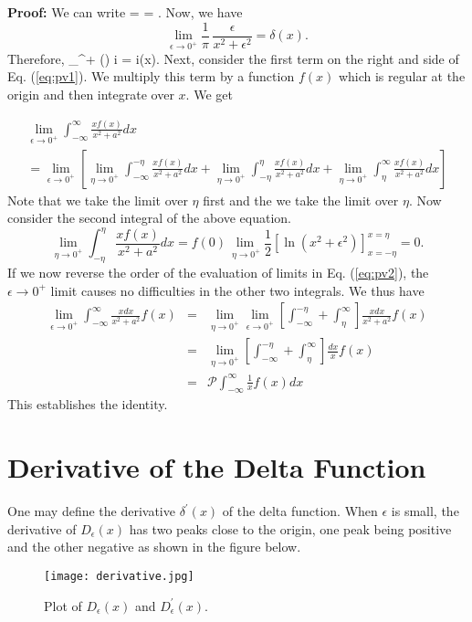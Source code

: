 \noindent
{\bf Proof:}\newline
We can write
\be
{} = =  \mp {}.
\label{eq:pv1}
\ee
Now, we have
\[ \lim_{\epsilon \rightarrow 0^+} \frac{1}{\pi}\, \frac{\epsilon}{x^2+ \epsilon^2} = \delta(x). \]
Therefore,
\be
\lim_{\epsilon {}^+} (\mp) i  = \mp i\pi \delta(x).
\ee
Next, consider the first term on the right and side of Eq. (\ref{eq:pv1}). We multiply this term by a function $f(x)$ which is regular 
at the origin and then integrate over $x$. We get

\begin{multline}
\lim_{\epsilon \rightarrow 0^+} \int_{-\infty}^{\infty}\frac{xf(x)}{x^2+a^2} dx \\
= \lim_{\epsilon \rightarrow 0^+} \left[ \lim_{\eta \rightarrow 0^+} \int_{-\infty}^{-\eta}\frac{xf(x)}{x^2+a^2} dx 
+ \lim_{\eta \rightarrow 0^+} \int_{-\eta}^{\eta}\frac{xf(x)}{x^2+a^2} dx 
+ \lim_{\eta \rightarrow 0^+} \int_{\eta}^{\infty}\frac{xf(x)}{x^2+a^2} dx \right]
\label{eq:pv2}
\end{multline}
Note that we take the limit over $\eta$ first and the we take the limit over $\eta$. Now consider the second integral of the above equation.
\[
\lim_{\eta \rightarrow 0^+} \int_{-\eta}^{\eta}\frac{xf(x)}{x^2+a^2} dx= f(0) \lim_{~\eta \rightarrow 0^+}
\frac{1}{2} \left[ \ln (x^2+ \epsilon^2) \right]_{x=-\eta}^{x=\eta} = 0.
\]
If we now reverse the order of the evaluation of limits in Eq. (\ref{eq:pv2}), the $\epsilon \rightarrow 0^+$ limit
causes no difficulties in the other two integrals. We thus have
\begin{eqnarray*}
\lim_{\epsilon \rightarrow 0^+} \int_{-\infty}^{\infty}\frac{xdx}{x^2+a^2}f(x) &=& \lim_{\eta \rightarrow 0^+}
\lim_{\epsilon \rightarrow 0^+}\left[ \int_{-\infty}^{-\eta} + \int_{\eta}^{\infty}\right] \frac{xdx}{x^2+a^2}f(x) \\
&=& \lim_{\eta \rightarrow 0^+} \left[ \int_{-\infty}^{-\eta} + \int_{\eta}^{\infty}\right] \frac{dx}{x}f(x)\\
&=& \mathcal{P}  \int_{-\infty}^{\infty} \frac{1}{x} f(x)dx
\end{eqnarray*}
This establishes the identity.


\section{Derivative of the Delta Function}
One may define the derivative $\delta^{\prime}(x)$ of the delta function. When $\epsilon$ is small, the derivative of 
$D_{\epsilon}(x)$ has two peaks close to the origin, one peak being positive and the other negative as shown in the figure
below.
\begin{figure}[h]
\centering
\texttt{[image: derivative.jpg]}
\caption{Plot of $D_{\epsilon}(x)$ and $D^{\prime}_{\epsilon}(x)$.}
\end{figure}


